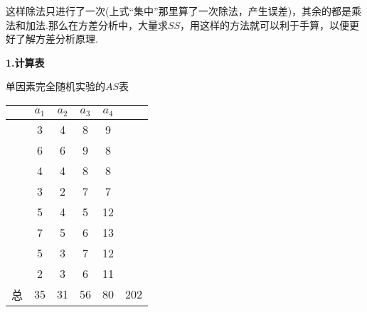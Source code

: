 这样除法只进行了一次(上式“集中”那里算了一次除法，产生误差)，其余的都是乘法和加法.那么在方差分析中，大量求$SS$，用这样的方法就可以利于手算，以便更好了解方差分析原理.


\textbf{1.计算表}

\begin{margintable}
	\centering
	\caption{单因素完全随机实验的$AS$表}
	{
		\begin{tabular}{cccccc}
			\toprule
    			     & $a_1$ &  $a_2$ &  $a_3$ &  $a_4$ & \\
    			     \midrule
                              & \cellcolor[rgb]{ .949,  .949,  .949}3 & \cellcolor[rgb]{ .949,  .949,  .949}4 & \cellcolor[rgb]{ .949,  .949,  .949}8 & \cellcolor[rgb]{ .949,  .949,  .949}9 &  \\
                              & \cellcolor[rgb]{ .949,  .949,  .949}6 & \cellcolor[rgb]{ .949,  .949,  .949}6 & \cellcolor[rgb]{ .949,  .949,  .949}9 & \cellcolor[rgb]{ .949,  .949,  .949}8 &  \\
                              & \cellcolor[rgb]{ .949,  .949,  .949}4 & \cellcolor[rgb]{ .949,  .949,  .949}4 & \cellcolor[rgb]{ .949,  .949,  .949}8 & \cellcolor[rgb]{ .949,  .949,  .949}8 &  \\
                              & \cellcolor[rgb]{ .949,  .949,  .949}3 & \cellcolor[rgb]{ .949,  .949,  .949}2 & \cellcolor[rgb]{ .949,  .949,  .949}7 & \cellcolor[rgb]{ .949,  .949,  .949}7 &  \\
                              & \cellcolor[rgb]{ .949,  .949,  .949}5 & \cellcolor[rgb]{ .949,  .949,  .949}4 & \cellcolor[rgb]{ .949,  .949,  .949}5 & \cellcolor[rgb]{ .949,  .949,  .949}12 &  \\
                              & \cellcolor[rgb]{ .949,  .949,  .949}7 & \cellcolor[rgb]{ .949,  .949,  .949}5 & \cellcolor[rgb]{ .949,  .949,  .949}6 & \cellcolor[rgb]{ .949,  .949,  .949}13 &  \\
                              & \cellcolor[rgb]{ .949,  .949,  .949}5 & \cellcolor[rgb]{ .949,  .949,  .949}3 & \cellcolor[rgb]{ .949,  .949,  .949}7 & \cellcolor[rgb]{ .949,  .949,  .949}12 &  \\
                              & \cellcolor[rgb]{ .949,  .949,  .949}2 & \cellcolor[rgb]{ .949,  .949,  .949}3 & \cellcolor[rgb]{ .949,  .949,  .949}6 & \cellcolor[rgb]{ .949,  .949,  .949}11 &  \\
                              \midrule
                        总     & \cellcolor[rgb]{ .886,  .937,  .855}35 & \cellcolor[rgb]{ .886,  .937,  .855}31 & \cellcolor[rgb]{ .886,  .937,  .855}56 & \cellcolor[rgb]{ .886,  .937,  .855}80 & \cellcolor[rgb]{ .867,  .922,  .969}202 \\
			\bottomrule
		\end{tabular}
	}
\end{margintable}


